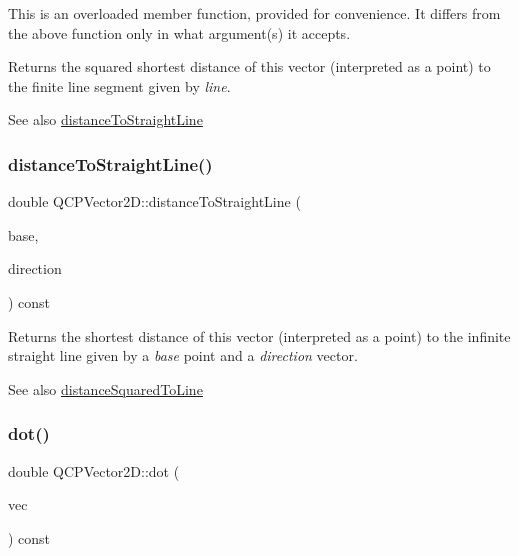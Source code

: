 This is an overloaded member function, provided for convenience. It differs from the above function only in what argument(s) it accepts.

Returns the squared shortest distance of this vector (interpreted as a point) to the finite line segment given by {\itshape line}.

\begin{DoxySeeAlso}{See also}
\mbox{\hyperlink{class_q_c_p_vector2_d_ae240b845c3744e43a5d0aa7b2bb66c19}{distance\+To\+Straight\+Line}} 
\end{DoxySeeAlso}
\mbox{\label{class_q_c_p_vector2_d_ae240b845c3744e43a5d0aa7b2bb66c19}} 
\subsubsection{\texorpdfstring{distance\+To\+Straight\+Line()}{distanceToStraightLine()}}
{\footnotesize\ttfamily double Q\+C\+P\+Vector2\+D\+::distance\+To\+Straight\+Line (\begin{DoxyParamCaption}\item[{const \mbox{\hyperlink{class_q_c_p_vector2_d}{Q\+C\+P\+Vector2D}} \&}]{base,  }\item[{const \mbox{\hyperlink{class_q_c_p_vector2_d}{Q\+C\+P\+Vector2D}} \&}]{direction }\end{DoxyParamCaption}) const}

Returns the shortest distance of this vector (interpreted as a point) to the infinite straight line given by a {\itshape base} point and a {\itshape direction} vector.

\begin{DoxySeeAlso}{See also}
\mbox{\hyperlink{class_q_c_p_vector2_d_a14840cd3da80cfee4eb3f8977cab89ab}{distance\+Squared\+To\+Line}} 
\end{DoxySeeAlso}
\mbox{\label{class_q_c_p_vector2_d_a39f8d28db7dbffcca6aa63a1f1f6e176}} 
\subsubsection{\texorpdfstring{dot()}{dot()}}
{\footnotesize\ttfamily double Q\+C\+P\+Vector2\+D\+::dot (\begin{DoxyParamCaption}\item[{const \mbox{\hyperlink{class_q_c_p_vector2_d}{Q\+C\+P\+Vector2D}} \&}]{vec }\end{DoxyParamCaption}) const\hspace{0.3cm}{\ttfamily [inline]}}

